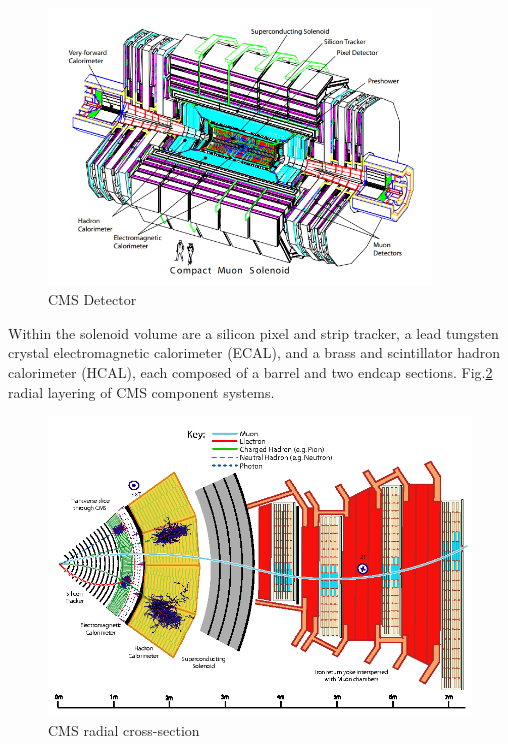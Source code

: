 \begin{figure}[h!]
\begin{centering}
\includegraphics[width=4in]{Chapter3/importfigs/fromCMS_DesignPaper_perspective.png}
\par\end{centering}
\caption{CMS Detector \label{fig:cmsCutOut}}
\end{figure}

Within the solenoid volume are a silicon pixel and strip tracker, a lead tungsten crystal electromagnetic calorimeter (ECAL), and a brass and scintillator hadron calorimeter (HCAL), each composed of a barrel and two endcap sections. Fig.\ref{fig:cmsCutOutZY} radial layering of CMS component systems.  


\begin{figure}[h!]
\begin{centering}
\includegraphics[width=5.5in]{Chapter3/importfigs/Figure_001.png}
\par\end{centering}
\caption{CMS radial cross-section \label{fig:cmsCutOutZY}}
\end{figure}

